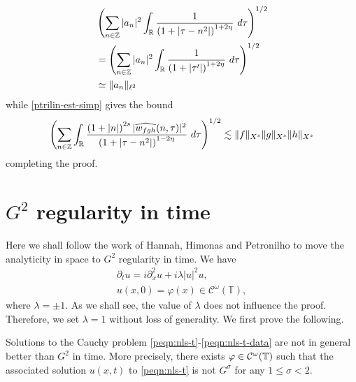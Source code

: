 \begin{equation*}
  \begin{split}
    & \left( \sum_{n \in \mathbb{Z}} | a_{n} |^2\int_{\mathbb{R}} \frac{1}{\left( 1 + | \tau -
    n^{2} | \right)^{1 + 2 \eta}} \ d \tau  
    \right)^{1/2} 
    \\
    & = \left ( \sum_{n \in \mathbb{Z}}
    | a_n |^2 
    \int_{\mathbb{R}} \frac{1}{\left( 1 + | \tau' | \right)^{1 + 2 \eta}} \ d 
    \tau \right)^{1/2}
    \\
    & \simeq \|a_n\|_{\ell^2}
    \end{split}
\end{equation*}
while \eqref{ptrilin-est-simp} gives the bound
\begin{equation*}
  \begin{split}
    \left ( \sum_{n \in \mathbb{Z}}\int_{\mathbb{R}} \frac{\left (1 + |n| \right )^{2s} | \widehat{{w}_{fgh}}(n, \tau) 
    |^2}{\left( 1 + | \tau - n^{2} | \right)^{1 - 2 \eta}}\ d \tau 
    \right)^{1/2} \lesssim \|f\|_{X^s} \|g\|_{X^s} \|h\|_{X^s}
  \end{split}
\end{equation*}
%
completing the proof.
\qquad \qedsymbol
%





%
%
%
%
%
%
%
%
%



%
\section{$G^2$  regularity in time} 
\label{pg2-rreg-3}
%
%
Here we shall  follow the work of  Hannah, Himonas and Petronilho
\cite{Hannah:2006uq}
to move the analyticity in space to $G^2$ regularity in time.
We have 
%
%
\begin{gather}
  \label{peqn:nls-t}
  \partial_tu=i\partial_x^2u+i\lambda |u|^2u,
  \\
  \label{peqn:nls-t-data}
  u(x,0)=\varphi(x) \in \mathcal{C}^\omega(\mathbb{T}),
\end{gather}
%
where $\lambda = \pm 1$. As we
shall see, the value of $\lambda$ does not influence the proof. Therefore, we
set $\lambda =1$ without loss of generality. We first prove the following.
%
%
%
%
%                
%
%
%
%
\begin{theorem}
  Solutions to the Cauchy problem \eqref{peqn:nls-t}-\eqref{peqn:nls-t-data}
  are not in general better than $G^{2}$ in time. More precisely, there exists
  $\varphi \in  \mathcal{C}^\omega(\mathbb{T})$ such that the associated solution
  $u(x,t)$ to \eqref{peqn:nls-t} is not $G^{\sigma}$ for any $1 \le \sigma <
  2$. 
\label{thm:sharp}
\end{theorem}
%
%

